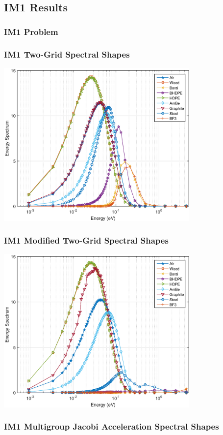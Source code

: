 \documentclass[compress,10pt]{beamer}
\begin{document}
\subsection{IM1 Results}
\begin{frame}[t]\frametitle{IM1 Problem}

\end{frame}
\begin{frame}[t]
{
\frametitle{IM1 Two-Grid Spectral Shapes}
\hspace*{1.1cm}
\includegraphics[width=0.75\textwidth]{images/IM1_EC_TG.eps}
}
{
\frametitle{IM1 Modified Two-Grid Spectral Shapes}
\hspace*{1.1cm}
\includegraphics[width=0.75\textwidth]{images/IM1_EC_MTG.eps}
}
{
\frametitle{IM1 Multigroup Jacobi Acceleration Spectral Shapes}
\hspace*{1.1cm}
}
\end{frame}
\end{document}
